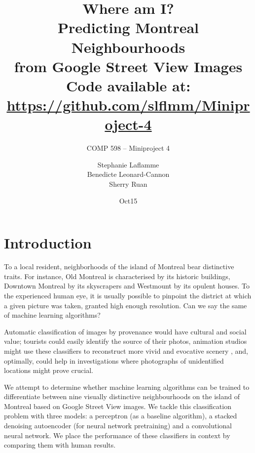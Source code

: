 \documentclass{acm_proc_article-sp}
\begin{document}
\title{Where am I? \\ Predicting Montreal Neighbourhoods \\from Google Street View Images  \\
{\normalsize Code available at: \url{https://github.com/slflmm/Miniproject-4}}} 
\subtitle{COMP 598 -- Miniproject 4}

\author{
\alignauthor 
Stephanie Laflamme\\
\alignauthor
Benedicte Leonard-Cannon\\
\alignauthor Sherry Ruan\\
}

\date{Oct15}



\maketitle
\begin{abstract}
\end{abstract}

\section{Introduction}%
To a local resident, neighborhoods of the island of Montreal bear distinctive traits. For instance, Old Montreal is characterised by its historic buildings, Downtown Montreal by its skyscrapers and Westmount by its opulent houses. To the experienced human eye, it is usually possible to pinpoint the district at which a given picture was taken, granted high enough resolution. Can we say the same of machine learning algorithms?  

Automatic classification of images by provenance would have cultural and social value; tourists could easily identify the source of their photos, animation studios might use these classifiers to reconstruct more vivid and evocative scenery \cite{Doersch}, and, optimally, could help in investigations where photographs of unidentified locations might prove crucial.

We attempt to determine whether machine learning algorithms can be trained to differentiate between nine visually distinctive neighbourhoods on the island of Montreal based on Google Street View images. We tackle this classification problem with three models: a perceptron (as a baseline algorithm), a stacked denoising autoencoder (for neural network pretraining) and a convolutional neural network. We place the performance of these classifiers in context by comparing them with human results.
\end{document}
